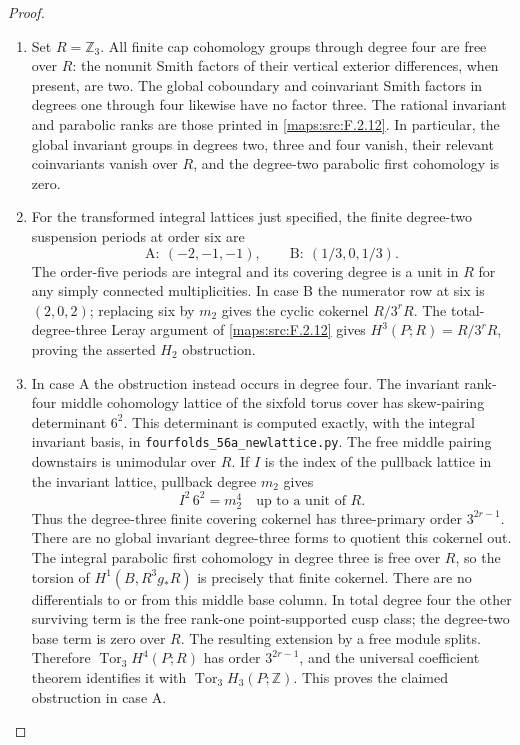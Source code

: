 \begin{proof}
\begin{enumerate}[label=\arabic*.]
\item Set $R=\mathbb Z_3$.  All finite cap cohomology groups
through degree four are free over $R$: the nonunit Smith
factors of their vertical exterior differences, when
present, are two.  The global coboundary and coinvariant
Smith factors in degrees one through four likewise have
no factor three.  The rational invariant and parabolic
ranks are those printed in \ref{maps:src:F.2.12}.  In particular,
the global invariant groups in degrees two, three and
four vanish, their relevant coinvariants vanish over $R$,
and the degree-two parabolic first cohomology is zero.

\item For the transformed integral lattices just specified, the
finite degree-two suspension periods at order six are
\[
 \mathrm A:\ (-2,-1,-1),\qquad
 \mathrm B:\ (1/3,0,1/3).
 \tag{F.37}\label{maps:eq:F.37}
\]
The order-five periods are integral and its covering degree
is a unit in $R$ for any simply connected multiplicities.
In case B the numerator row at six is $(2,0,2)$; replacing
six by $m_2$ gives the cyclic cokernel $R/3^rR$.
The total-degree-three Leray argument of \ref{maps:src:F.2.12} gives
$H^3(P;R)=R/3^rR$, proving the asserted $H_2$ obstruction.

\item In case A the obstruction instead occurs in degree four.
The invariant rank-four middle cohomology lattice of the
sixfold torus cover has skew-pairing determinant $6^2$.
This determinant is computed exactly, with the integral
invariant basis, in \texttt{fourfolds\_56a\_newlattice.py}.
The free middle pairing downstairs is unimodular over $R$.
If $I$ is the index of the pullback lattice in the invariant
lattice, pullback degree $m_2$ gives
\[
 I^2\,6^2=m_2^4
 \quad\text{up to a unit of }R.
 \tag{F.38}\label{maps:eq:F.38}
\]
Thus the degree-three finite covering cokernel has
three-primary order $3^{2r-1}$.
There are no global invariant degree-three forms to
quotient this cokernel out.  The integral parabolic first
cohomology in degree three is free over $R$, so the torsion
of $H^1(B,R^3g_*R)$ is precisely that finite cokernel.
There are no differentials to or from this middle base
column.  In total degree four the other surviving term
is the free rank-one point-supported cusp class;
the degree-two base term is zero over $R$.
The resulting extension by a free module splits.
Therefore $\operatorname{Tor}_3H^4(P;R)$ has order
$3^{2r-1}$, and the universal coefficient theorem identifies
it with $\operatorname{Tor}_3H_3(P;\mathbb Z)$.
This proves the claimed obstruction in case A.

\end{enumerate}
\end{proof}
